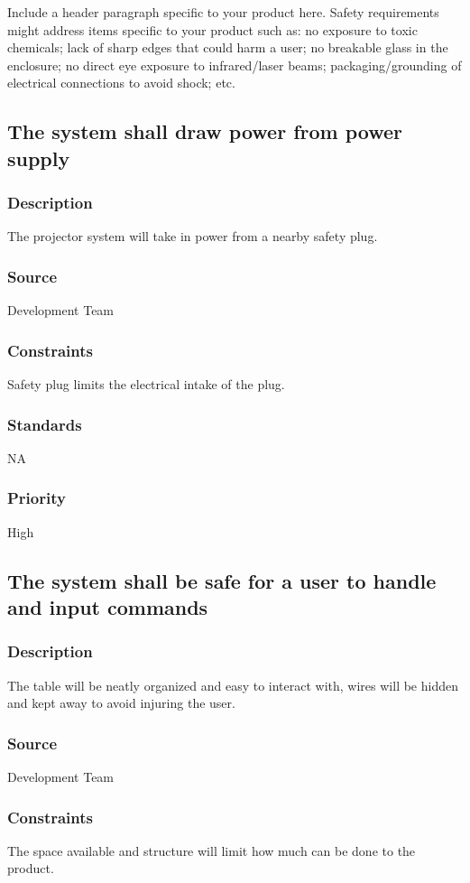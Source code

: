 Include a header paragraph specific to your product here. Safety requirements might address items specific to your product such as: no exposure to toxic chemicals; lack of sharp edges that could harm a user; no breakable glass in the enclosure; no direct eye exposure to infrared/laser beams; packaging/grounding of electrical connections to avoid shock; etc.

\subsection{The system shall draw power from power supply  }
\subsubsection{Description}
The projector system will take in power from a nearby safety plug.
\subsubsection{Source}
Development Team
\subsubsection{Constraints}
Safety plug limits the electrical intake of the plug.
\subsubsection{Standards}
NA
\subsubsection{Priority}
High

\subsection{The system shall be safe for a user to handle and input commands }
\subsubsection{Description}
The table will be neatly organized and easy to interact with, wires will be hidden and kept away to avoid injuring the user.
\subsubsection{Source}
Development Team
\subsubsection{Constraints}
The space available and structure will limit how much can be done to the product.
